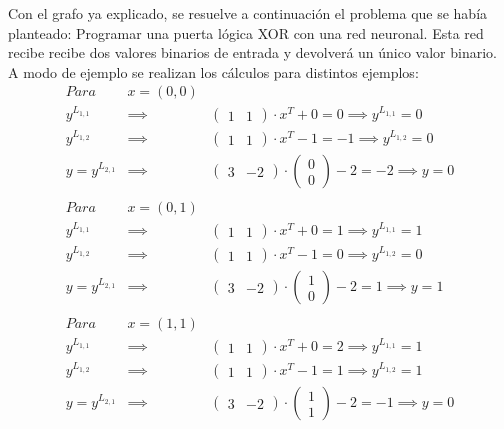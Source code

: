 Con el grafo ya explicado, se resuelve a continuación el problema que se había planteado: Programar una puerta lógica XOR con una red neuronal. Esta red recibe recibe dos valores binarios de entrada y devolverá un único valor binario. A modo de ejemplo se realizan los cálculos para distintos ejemplos:
\begin{eqnarray}
    Para &\boxed{x = (0, 0)} \nonumber\\
    y^{L_{1,1}} & \implies & \begin{pmatrix}1&1\end{pmatrix} \cdot x^T + 0 = 0 \implies y^{L_{1,1}} = 0 \nonumber\\
    y^{L_{1,2}} & \implies &\begin{pmatrix}1&1\end{pmatrix} \cdot x^T - 1 = -1 \implies y^{L_{1,2}} = 0 \nonumber \\
    y = y^{L_{2,1}} & \implies &\begin{pmatrix}3&-2\end{pmatrix} \cdot \begin{pmatrix}0\\0\end{pmatrix} - 2= -2 \implies \boxed{y = 0} \nonumber \\ \nonumber \\
    Para &\boxed{x = (0, 1)} \nonumber\\
    y^{L_{1,1}} & \implies &\begin{pmatrix}1&1\end{pmatrix} \cdot x^T + 0 = 1 \implies y^{L_{1,1}} = 1\nonumber\\
    y^{L_{1,2}} & \implies &\begin{pmatrix}1&1 \end{pmatrix} \cdot x^T - 1 = 0 \implies y^{L_{1,2}} = 0\nonumber\\
    y = y^{L_{2,1}} & \implies &\begin{pmatrix}3&-2\end{pmatrix} \cdot \begin{pmatrix}1\\0\end{pmatrix} - 2 = 1 \implies \boxed{y = 1}\nonumber \\ \nonumber \\
    Para &\boxed{x = (1, 1)} \nonumber\\
    y^{L_{1,1}} & \implies &\begin{pmatrix}1&1\end{pmatrix} \cdot x^T + 0 = 2 \implies y^{L_{1,1}} = 1\nonumber\\
    y^{L_{1,2}} & \implies &\begin{pmatrix}1&1 \end{pmatrix} \cdot x^T - 1 = 1 \implies y^{L_{1,2}} = 1\nonumber\\
    y = y^{L_{2,1}} & \implies &\begin{pmatrix}3&-2\end{pmatrix} \cdot \begin{pmatrix}1\\1\end{pmatrix} - 2 = -1 \implies \boxed{y = 0}\nonumber \\ \nonumber
\end{eqnarray}
